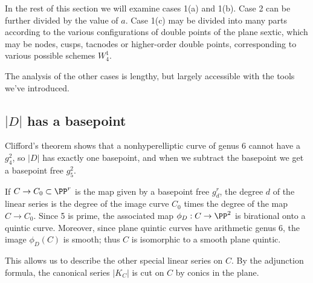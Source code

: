 In the rest of this section we will examine cases 1(a) and 1(b). Case 2 can
be further divided by the value of $a$.
Case 1(c) may be divided into many parts according to the various
configurations
of double points of the plane sextic, which may be nodes, cusps, tacnodes
or higher-order double points,  corresponding to various possible
schemes $W^{1}_{4}$.

The analysis of the other cases is lengthy, but largely accessible with
the tools we've introduced.


\subsection*{$|D|$ has a basepoint}

Clifford's theorem shows that a nonhyperelliptic curve of genus 6 cannot
have a $g^2_4$, so
$|D|$ has exactly one basepoint, and when we subtract the basepoint we
get a basepoint free $g^2_5$.
%

If $C \to C_0 \subset \PP^r$ is the map given by a basepoint free $g^r_d$,
the degree $d$ of the linear series is the degree of the image curve $C_0$
times the degree of the map $C \to C_0$. Since 5 is prime, the associated
map $\phi_D : C \to \PP^2$ is birational onto a quintic curve. Moreover,
since
%
plane quintic
 curves have
arithmetic genus 6,
%
the image $\phi_D(C)$
is smooth; thus $C$ is isomorphic to a smooth plane quintic.

This allows us to describe the other special linear series on $C$. By
the adjunction formula, the canonical series $|K_C|$ is cut on $C$
by conics in the plane.


